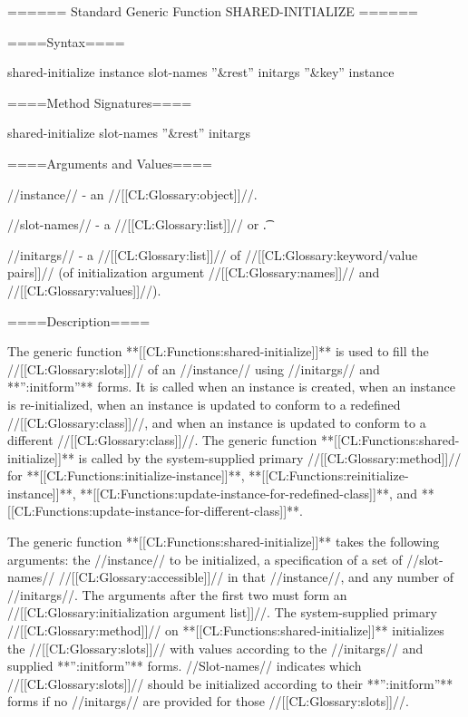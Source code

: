 ====== Standard Generic Function SHARED-INITIALIZE ======

====Syntax====


\DefgenWithValues shared-initialize {instance slot-names ''&rest'' initargs ''&key'' {\allowotherkeys}} {instance}


====Method Signatures====

\Defmeth shared-initialize { slot-names ''&rest'' initargs}

====Arguments and Values====

//instance// - an //[[CL:Glossary:object]]//.

//slot-names// - a //[[CL:Glossary:list]]// or \t.

//initargs// - a //[[CL:Glossary:list]]// of //[[CL:Glossary:keyword/value pairs]]// (of initialization argument //[[CL:Glossary:names]]// and //[[CL:Glossary:values]]//).

====Description====

The generic function **[[CL:Functions:shared-initialize]]** is used to fill the //[[CL:Glossary:slots]]// of an //instance// using //initargs// and **'':initform''** forms. It is called when an instance is created, when an instance is re-initialized, when an instance is updated to conform to a redefined //[[CL:Glossary:class]]//, and when an instance is updated to conform to a different //[[CL:Glossary:class]]//. The generic function **[[CL:Functions:shared-initialize]]** is called by the system-supplied primary //[[CL:Glossary:method]]// for **[[CL:Functions:initialize-instance]]**, **[[CL:Functions:reinitialize-instance]]**, **[[CL:Functions:update-instance-for-redefined-class]]**, and **[[CL:Functions:update-instance-for-different-class]]**.

The generic function **[[CL:Functions:shared-initialize]]** takes the following arguments: the //instance// to be initialized, a specification of a set of //slot-names// //[[CL:Glossary:accessible]]// in that //instance//, and any number of //initargs//. The arguments after the first two must form an //[[CL:Glossary:initialization argument list]]//. The system-supplied primary //[[CL:Glossary:method]]// on **[[CL:Functions:shared-initialize]]** initializes the //[[CL:Glossary:slots]]// with values according to the //initargs// and supplied **'':initform''** forms. //Slot-names// indicates which //[[CL:Glossary:slots]]// should be initialized according to their **'':initform''** forms if no //initargs// are provided for those //[[CL:Glossary:slots]]//.

